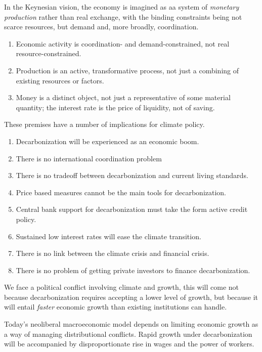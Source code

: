 \documentclass[
]{book}
\begin{document}
In the Keynesian vision, the economy is imagined as aa system of \emph{monetary production} rather than real exchange, with the binding constraints being not scarce resources, but demand and, more broadly, coordination.

\begin{enumerate}
\def\labelenumi{\arabic{enumi}.}
\item
  Economic activity is coordination- and demand-constrained, not real resource-constrained.
\item
  Production is an active, transformative process, not just a combining of existing resources or factors.
\item
  Money is a distinct object, not just a representative of some material quantity; the interest rate is the price of liquidity, not of saving.
\end{enumerate}

These premises have a number of implications for climate policy.

\begin{enumerate}
\def\labelenumi{\arabic{enumi}.}
\item
  Decarbonization will be experienced as an economic boom.
\item
  There is no international coordination problem
\item
  There is no tradeoff between decarbonization and current living standards.
\item
  Price based measures cannot be the main tools for decarbonization.
\item
  Central bank support for decarbonization must take the form active credit policy.
\item
  Sustained low interest rates will ease the climate transition.
\item
  There is no link between the climate crisis and financial crisis.
\item
  There is no problem of getting private investors to finance decarbonization.
\end{enumerate}

We face a political conflict involving climate and growth,
this will come not because decarbonization requires accepting a lower level of growth,
but because it will entail \emph{faster} economic growth
than existing institutions can handle.

Today's neoliberal macroeconomic model depends on limiting economic growth as a way of managing distributional conflicts. Rapid growth under decarbonization will be accompanied by disproportionate rise in wages and the power of workers.
\end{document}
